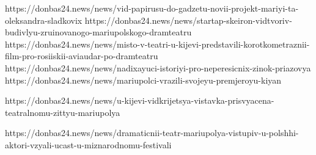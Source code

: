  
 
 
 
 


https://donbas24.news/news/vid-papirusu-do-gadzetu-novii-projekt-mariyi-ta-oleksandra-sladkovix
https://donbas24.news/news/startap-skeiron-vidtvoriv-budivlyu-zruinovanogo-mariupolskogo-dramteatru
https://donbas24.news/news/misto-v-teatri-u-kijevi-predstavili-korotkometraznii-film-pro-rosiiskii-aviaudar-po-dramteatru
https://donbas24.news/news/nadixayuci-istoriyi-pro-neperesicnix-zinok-priazovya
https://donbas24.news/news/mariupolci-vrazili-svojeyu-premjeroyu-kiyan

https://donbas24.news/news/u-kijevi-vidkrijetsya-vistavka-prisvyacena-teatralnomu-zittyu-mariupolya

https://donbas24.news/news/dramaticnii-teatr-mariupolya-vistupiv-u-polshhi-aktori-vzyali-ucast-u-miznarodnomu-festivali
